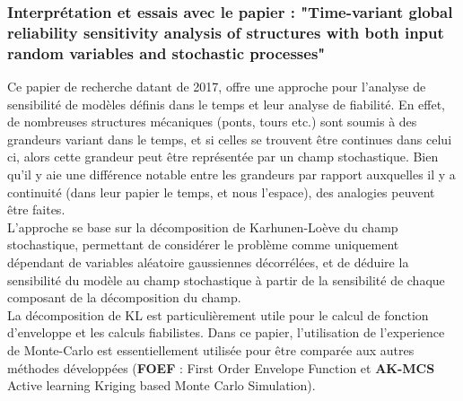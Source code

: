\documentclass[a4paper,10pt]{article}
\begin{document}



\subsubsection{Interprétation et essais avec le papier : "Time-variant global reliability sensitivity analysis of structures with both input random variables and stochastic processes"}
Ce papier de recherche datant de 2017, offre une approche pour l'analyse de sensibilité de modèles définis dans le temps et leur analyse de fiabilité. En effet, de nombreuses structures mécaniques (ponts, tours etc.) sont soumis à des grandeurs variant dans le temps, et si celles se trouvent être continues dans celui ci, alors cette grandeur peut être représentée par un champ stochastique. Bien qu'il y aie une différence notable entre les grandeurs par rapport auxquelles il y a continuité (dans leur papier le temps, et nous l'espace), des analogies peuvent être faites. \\

L'approche se base sur la décomposition de Karhunen-Loève du champ stochastique, permettant de considérer le problème comme uniquement dépendant de variables aléatoire gaussiennes décorrélées, et de déduire la sensibilité du modèle au champ stochastique à partir de la sensibilité de chaque composant de la décomposition du champ. \\ 

La décomposition de KL est particulièrement utile pour le calcul de fonction d'enveloppe et les calculs fiabilistes. Dans ce papier, l'utilisation de l'experience de Monte-Carlo est essentiellement utilisée pour être comparée aux autres méthodes développées (\textbf{FOEF} : First Order Envelope Function et \textbf{AK-MCS} Active learning Kriging based Monte Carlo Simulation).\\
\end{document}
